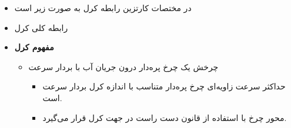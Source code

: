 \begin{ELjoin}

\begin{itemize}
\tightlist
\item
  در مختصات کارتزین رابطه کرل به صورت زیر است
\end{itemize}

\begin{ELimportant}{}


\end{ELimportant}

\end{ELjoin}

\begin{ELjoin}

\begin{itemize}
\tightlist
\item
  رابطه کلی کرل
\end{itemize}

\begin{ELimportant}{}


\end{ELimportant}

\end{ELjoin}

\begin{ELunit}

\begin{itemize}
\tightlist
\item
  \textbf{مفهوم کرل}

  \begin{itemize}
  \tightlist
  \item
    چرخش یک چرخ پره‌دار درون جریان آب با بردار سرعت 

    \begin{itemize}
    \tightlist
    \item
      حداکثر سرعت زاویه‌ای چرخ پره‌دار متناسب با اندازه کرل بردار سرعت است.
    \item
      محور چرخ با استفاده از قانون دست راست در جهت کرل قرار می‌گیرد.
    \end{itemize}
  \end{itemize}
\end{itemize}


\end{ELunit}


